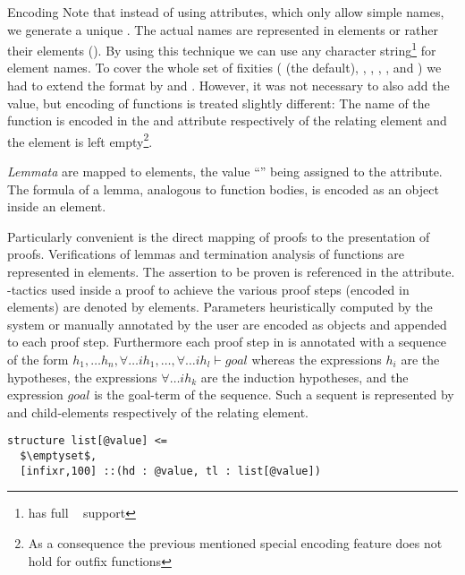 \begin{omgroup}[id=verifun,short=VeriFun,creators={nmueller}]
\begin{omgroup}{Encoding}
Note that instead of using {} attributes, which only allow {\xml}
simple names, we generate a unique {}. The actual {\verifun} names are represented
in {} elements or rather their {} elements
(). By using this technique we can use any character
string\footnote{{\verifun} has full {\unicode}~\cite{Unicode:tuc03} support} for element
names. To cover the whole set of {\verifun} fixities
({} (the default),
{}, {},
{}, {}, and
{}) we had to extend the {\omdoc} format by
{} and
{}. However, it was not necessary to also add the
{} value, but encoding of
{} functions is treated slightly different: The name
of the function is encoded in the {} and
{} attribute respectively of the relating
{} element and the {} element is left empty\footnote{As
  a consequence the previous mentioned special encoding feature does not hold for outfix
  functions}.

{\emph{Lemmata}} are mapped to {} elements, the value
``{}'' being assigned to the {}
attribute. The formula of a lemma, analogous to function bodies, is encoded as an
{\openmath} object inside an {} element.

Particularly convenient is the direct mapping of {\verifun} proofs to the {\omdoc}
presentation of proofs. Verifications of lemmas and termination analysis of functions are
represented in {} elements. The assertion to be proven is referenced in the
{} attribute. {}-tactics used inside a proof to achieve the
various proof steps (encoded in { elements}) are denoted by
{} elements. Parameters heuristically computed by the system or manually
annotated by the user are encoded as {\openmath} objects and appended to each proof
step. Furthermore each proof step in {\verifun} is annotated with a sequence of the form
$h_1, \dots h_n, \forall \dots ih_1, \dots, \forall \dots ih_l \vdash goal$ whereas the
expressions $h_i$ are the hypotheses, the expressions $\forall \dots ih_k$ are the
induction hypotheses, and the expression $goal$ is the goal-term of the sequence. Such a
sequent is represented by {} and {} child-elements
respectively of the relating {} element.
\begin{lstlisting}[escapechar=\%,mathescape,label=lst:vf:adt,caption={A polymorphic {\verifun} sort}]
structure list[@value] <=
  $\emptyset$,
  [infixr,100] ::(hd : @value, tl : list[@value])
\end{lstlisting}


\end{omgroup}
\end{omgroup}

